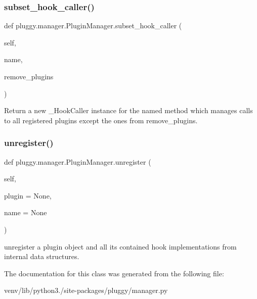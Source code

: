 \subsubsection{\texorpdfstring{subset\+\_\+hook\+\_\+caller()}{subset\_hook\_caller()}}
{\footnotesize\ttfamily def pluggy.\+manager.\+Plugin\+Manager.\+subset\+\_\+hook\+\_\+caller (\begin{DoxyParamCaption}\item[{}]{self,  }\item[{}]{name,  }\item[{}]{remove\+\_\+plugins }\end{DoxyParamCaption})}

\begin{DoxyVerb}Return a new _HookCaller instance for the named method
which manages calls to all registered plugins except the
ones from remove_plugins. \end{DoxyVerb}
 \mbox{\label{classpluggy_1_1manager_1_1_plugin_manager_acd20d8caae1578e75475ab547d87f33e}} 
\subsubsection{\texorpdfstring{unregister()}{unregister()}}
{\footnotesize\ttfamily def pluggy.\+manager.\+Plugin\+Manager.\+unregister (\begin{DoxyParamCaption}\item[{}]{self,  }\item[{}]{plugin = {\ttfamily None},  }\item[{}]{name = {\ttfamily None} }\end{DoxyParamCaption})}

\begin{DoxyVerb}unregister a plugin object and all its contained hook implementations
from internal data structures. \end{DoxyVerb}
 

The documentation for this class was generated from the following file\+:\begin{DoxyCompactItemize}
\item 
venv/lib/python3./site-\/packages/pluggy/manager.\+py\end{DoxyCompactItemize}

